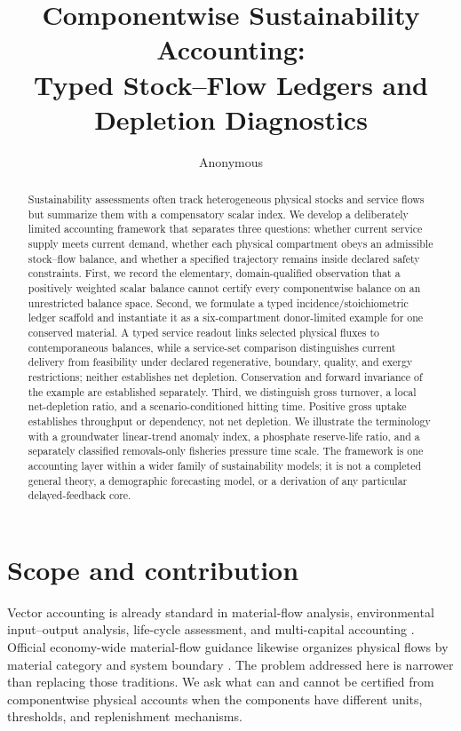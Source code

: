 \documentclass[11pt]{article}
\title{Componentwise Sustainability Accounting:\\
Typed Stock--Flow Ledgers and Depletion Diagnostics}
\author{Anonymous}
\date{}
\begin{document}
\maketitle

\begin{abstract}
Sustainability assessments often track heterogeneous physical stocks and service flows but summarize them with a compensatory scalar index. We develop a deliberately limited accounting framework that separates three questions: whether current service supply meets current demand, whether each physical compartment obeys an admissible stock--flow balance, and whether a specified trajectory remains inside declared safety constraints. First, we record the elementary, domain-qualified observation that a positively weighted scalar balance cannot certify every componentwise balance on an unrestricted balance space. Second, we formulate a typed incidence/stoichiometric ledger scaffold and instantiate it as a six-compartment donor-limited example for one conserved material. A typed service readout links selected physical fluxes to contemporaneous balances, while a service-set comparison distinguishes current delivery from feasibility under declared regenerative, boundary, quality, and exergy restrictions; neither establishes net depletion. Conservation and forward invariance of the example are established separately. Third, we distinguish gross turnover, a local net-depletion ratio, and a scenario-conditioned hitting time. Positive gross uptake establishes throughput or dependency, not net depletion. We illustrate the terminology with a groundwater linear-trend anomaly index, a phosphate reserve-life ratio, and a separately classified removals-only fisheries pressure time scale. The framework is one accounting layer within a wider family of sustainability models; it is not a completed general theory, a demographic forecasting model, or a derivation of any particular delayed-feedback core.
\end{abstract}

\section{Scope and contribution}

Vector accounting is already standard in material-flow analysis, environmental input--output analysis, life-cycle assessment, and multi-capital accounting \cite{leontief1970,iso14040,seea2014,dasgupta2021}. Official economy-wide material-flow guidance likewise organizes physical flows by material category and system boundary \cite{eurostat2001}. The problem addressed here is narrower than replacing those traditions. We ask what can and cannot be certified from componentwise physical accounts when the components have different units, thresholds, and replenishment mechanisms.
\end{document}
